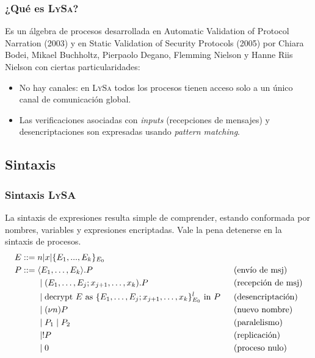 \documentclass{beamer}
\begin{document}
\begin{frame}
    \frametitle{¿Qué es L\textsc{y}S\textsc{a}?}
    \pause
    Es un álgebra de procesos desarrollada en Automatic Validation of Protocol Narration (2003) y en Static Validation of Security Protocols (2005) por Chiara Bodei, Mikael Buchholtz, Pierpaolo Degano, Flemming Nielson y Hanne Riis Nielson con ciertas particularidades:
    \pause[2]
    \begin{itemize}
        \item<3-> No hay canales: en L\textsc{y}S\textsc{a} todos los procesos tienen acceso solo a un único canal de comunicación global. 
        \item<4-> Las verificaciones asociadas con \textit{inputs} (recepciones de mensajes) y desencriptaciones son expresadas usando \textit{pattern matching}.

    \end{itemize}

\end{frame}

\subsection{Sintaxis}

\begin{frame}
    \frametitle{Sintaxis L\textsc{y}S\textsc{A}}
    \pause
    La sintaxis de expresiones resulta simple de comprender, estando conformada por nombres, variables y expresiones encriptadas. Vale la pena detenerse en la sintaxis de procesos.
    \pause[3]
    \begin{align*}
    E &::= n | x | \{ E_1, ..., E_k \}_{E_0}\\
    P &::= \begin{aligned}[t]
            &\langle E_1, \dots, E_k \rangle.P \hspace{0.2cm}
            &&\text{(envío de msj)} \\
            &\mid (E_1, \ldots, E_j; x_{j+1}, \ldots, x_k).P \hspace{0.1cm} &&\text{(recepción de msj)} \\
            &\mid \text{decrypt } E \text{ as } \{E_1, \ldots, E_j; x_{j+1}, \ldots, x_k\}^{l}_{E_0} \text{ in } P \hspace{0.2cm} &&\text{(desencriptación)} \\
            &\mid (\nu n)P \hspace{0.2cm} &&\text{(nuevo nombre)}\\ 
            &\mid P_1 \mid P_2 \hspace{0.2cm} &&\text{(paralelismo)}\\
            &\mid !P \hspace{0.2cm} &&\text{(replicación)}\\ 
            &\mid 0 \hspace{0.2cm} &&\text{(proceso nulo)}\\
        \end{aligned}
\end{align*}
\end{frame}
\end{document}
